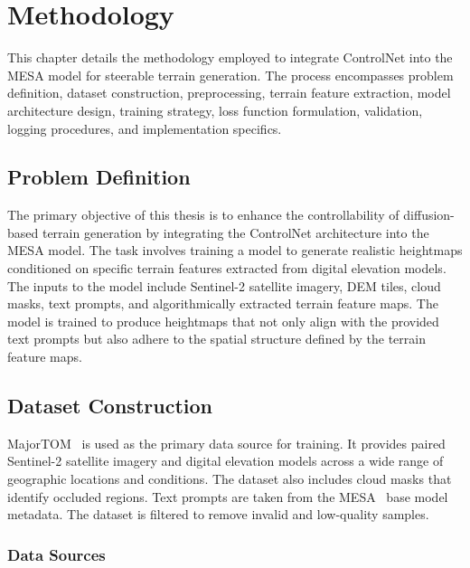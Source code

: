 \chapter{Methodology}
\label{cha:methodology}

This chapter details the methodology employed to integrate ControlNet into the MESA model for steerable terrain generation. The process encompasses problem definition, dataset construction, preprocessing, terrain feature extraction, model architecture design, training strategy, loss function formulation, validation, logging procedures, and implementation specifics.

\section{Problem Definition}
\label{sec:problem_definition}

The primary objective of this thesis is to enhance the controllability of diffusion-based terrain generation by integrating the ControlNet architecture into the MESA model. The task involves training a model to generate realistic heightmaps conditioned on specific terrain features extracted from digital elevation models. The inputs to the model include Sentinel-2 satellite imagery, DEM tiles, cloud masks, text prompts, and algorithmically extracted terrain feature maps. The model is trained to produce heightmaps that not only align with the provided text prompts but also adhere to the spatial structure defined by the terrain feature maps.

\section{Dataset Construction}
\label{sec:dataset_construction}

MajorTOM~\cite{schulz2024majortom} is used as the primary data source for training. It provides paired Sentinel-2 satellite imagery and digital elevation models across a wide range of geographic locations and conditions. The dataset also includes cloud masks that identify occluded regions. Text prompts are taken from the MESA~\cite{borne-pons2025mesa} base model metadata. The dataset is filtered to remove invalid and low-quality samples.

\subsection{Data Sources}
\label{subsec:data_sources}


